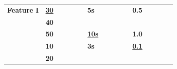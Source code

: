 \begin{table}[H]
\begin{tabular}{l|lllll|llllllllll|}
\multicolumn{1}{|l|}{\textbf{Feature I}}  & \multicolumn{1}{l|}{{\ul \textbf{30}}} & \multicolumn{1}{l|}{}            & \multicolumn{1}{l|}{}            & \multicolumn{1}{l|}{}            &             & \multicolumn{1}{l|}{\textbf{5s}}        & \multicolumn{1}{l|}{}            & \multicolumn{1}{l|}{}            & \multicolumn{1}{l|}{}            & \multicolumn{1}{l|}{}            & \multicolumn{1}{l|}{\textbf{0.5}}       & \multicolumn{1}{l|}{}            & \multicolumn{1}{l|}{}            & \multicolumn{1}{l|}{}            &             \\ \cline{2-16} 
\multicolumn{1}{|l|}{\textbf{}}           & \multicolumn{1}{l|}{\textbf{40}}       & \multicolumn{1}{l|}{}            & \multicolumn{1}{l|}{}            & \multicolumn{1}{l|}{}            &             &                                         &                                  &                                  &                                  &                                  & \textbf{}                               &                                  &                                  &                                  &             \\ \cline{2-16} 
\multicolumn{1}{|l|}{\textbf{}}           & \multicolumn{1}{l|}{\textbf{50}}       & \multicolumn{1}{l|}{}            & \multicolumn{1}{l|}{}            & \multicolumn{1}{l|}{}            &             & \multicolumn{1}{l|}{{\ul \textbf{10s}}} & \multicolumn{1}{l|}{}            & \multicolumn{1}{l|}{}            & \multicolumn{1}{l|}{}            & \multicolumn{1}{l|}{}            & \multicolumn{1}{l|}{\textbf{1.0}}       & \multicolumn{1}{l|}{}            & \multicolumn{1}{l|}{}            & \multicolumn{1}{l|}{}            &             \\ \hline
\multicolumn{1}{|l|}{\textbf{}}           & \multicolumn{1}{l|}{\textbf{10}}       & \multicolumn{1}{l|}{}            & \multicolumn{1}{l|}{}            & \multicolumn{1}{l|}{}            &             & \multicolumn{1}{l|}{\textbf{3s}}        & \multicolumn{1}{l|}{}            & \multicolumn{1}{l|}{}            & \multicolumn{1}{l|}{}            & \multicolumn{1}{l|}{}            & \multicolumn{1}{l|}{{\ul \textbf{0.1}}} & \multicolumn{1}{l|}{}            & \multicolumn{1}{l|}{}            & \multicolumn{1}{l|}{}            &             \\ \cline{2-16} 
\multicolumn{1}{|l|}{\textbf{}}           & \multicolumn{1}{l|}{\textbf{20}}       & \multicolumn{1}{l|}{}            & \multicolumn{1}{l|}{}            & \multicolumn{1}{l|}{}            &             &                                         &                                  &                                  &                                  &                                  &                                         &                                  &                                  &                                  &             \\ \cline{2-16} 

\end{tabular}
\end{table}
